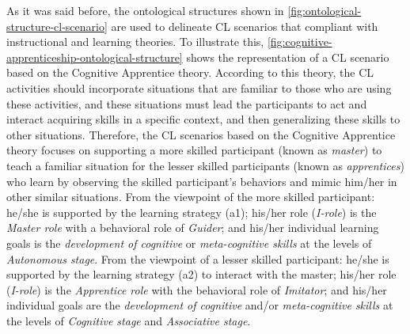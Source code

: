 As it was said before, the ontological structures shown in \autoref{fig:ontological-structure-cl-scenario} are used to delineate CL scenarios that compliant with instructional and learning theories.
To illustrate this, \autoref{fig:cognitive-apprenticeship-ontological-structure} shows the representation of a CL scenario based on the Cognitive Apprentice theory.
According to this theory, the CL activities should incorporate situations that are familiar to those who are using these activities, and these situations must lead the participants to act and interact acquiring skills in a specific context, and then generalizing these skills to other situations.
Therefore, the CL scenarios based on the Cognitive Apprentice theory focuses on supporting a more skilled participant (known as \emph{master}) to teach a familiar situation for the lesser skilled participants (known as \emph{apprentices}) who learn by observing the skilled participant's behaviors and mimic him/her in other similar situations.
From the viewpoint of the more skilled participant:
he/she is supported by the learning strategy  (a1);
his/her role (\emph{I-role}) is the \emph{Master role} with a behavioral role of \emph{Guider}; and
his/her individual learning goals is the \emph{development of cognitive} or \emph{meta-cognitive skills} at the levels of \emph{Autonomous stage}.
From the viewpoint of a lesser skilled participant:
he/she is supported by the learning strategy  (a2) to interact with the master;
his/her role (\emph{I-role}) is the \emph{Apprentice role} with the behavioral role of \emph{Imitator}; and
his/her individual goals are the \emph{development of cognitive} and/or \emph{meta-cognitive skills} at the levels of \emph{Cognitive stage} and \emph{Associative stage}.

